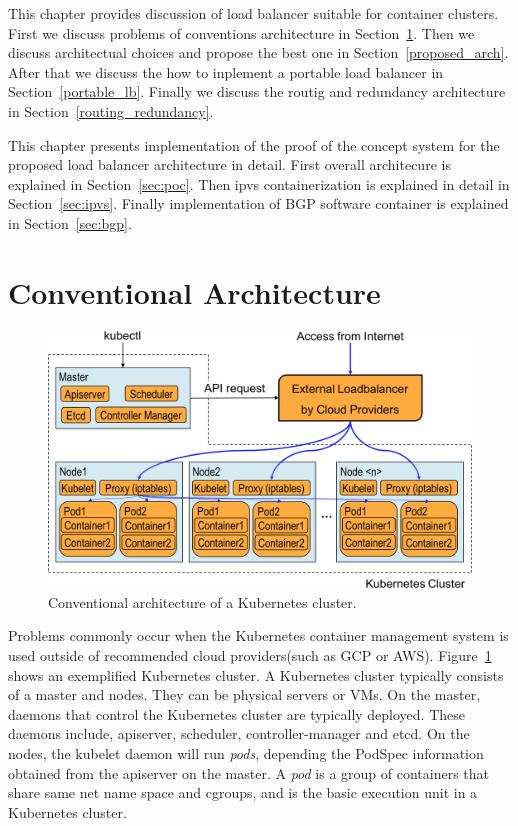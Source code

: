 This chapter provides discussion of load balancer suitable for container clusters.
First we discuss problems of conventions architecture in Section~\ref{problem_k8s}.
Then we discuss architectual choices and propose the best one in Section~\ref{proposed_arch}.
After that we discuss the how to inplement a portable load balancer in Section~\ref{portable_lb}. 
Finally we discuss the routig and redundancy architecture in Section~\ref{routing_redundancy}.

This chapter presents implementation of the proof of the concept system for the proposed load balancer architecture in detail.
First overall architecure is explained in Section~\ref{sec:poc}.
Then ipvs containerization is explained in detail in Section~\ref{sec:ipvs}.
Finally implementation of BGP software container is explained in Section~\ref{sec:bgp}.

\section{Conventional Architecture}\label{problem_k8s}

\begin{figure}
  \centering
  \includegraphics[width=0.8\columnwidth]{Figs/K8sConventional}
  \caption{Conventional architecture of a Kubernetes cluster.}
  \label{fig:K8sConventional}
\end{figure}

Problems commonly occur when the Kubernetes container management system is used outside of recommended cloud providers(such as GCP or AWS).
Figure~\ref{fig:K8sConventional} shows an exemplified Kubernetes cluster.
A Kubernetes cluster typically consists of a master and nodes. They can be physical servers or VMs.
On the master, daemons that control the Kubernetes cluster are typically deployed. 
These daemons include, apiserver, scheduler, controller-manager and etcd. 
On the nodes, the kubelet daemon will run {\it pods}, depending the PodSpec information obtained from the apiserver on the master.
A {\em pod} is a group of containers that share same net name space and cgroups, 
and is the basic execution unit in a Kubernetes cluster.

